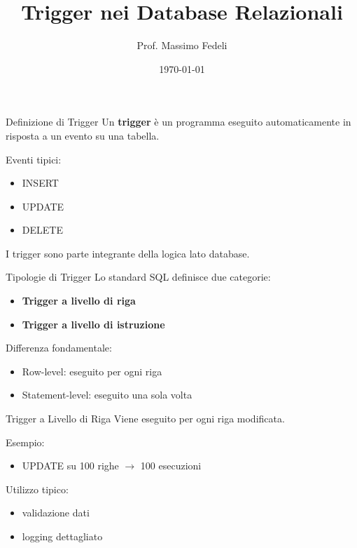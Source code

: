 \documentclass{beamer}
\title{Trigger nei Database Relazionali}
\author{Prof. Massimo Fedeli}
\date{\today}
\begin{document}
	
	\frame{\titlepage}
	
	\begin{frame}{Definizione di Trigger}
		Un \textbf{trigger} è un programma eseguito automaticamente in risposta a un evento su una tabella.
		
		\bigskip
		
		Eventi tipici:
		\begin{itemize}
			\item INSERT
			\item UPDATE
			\item DELETE
		\end{itemize}
		
		\bigskip
		
		I trigger sono parte integrante della logica lato database.
	\end{frame}
	
	\begin{frame}{Tipologie di Trigger}
		Lo standard SQL definisce due categorie:
		
		\begin{itemize}
			\item \textbf{Trigger a livello di riga}
			\item \textbf{Trigger a livello di istruzione}
		\end{itemize}
		
		\bigskip
		
		Differenza fondamentale:
		\begin{itemize}
			\item Row-level: eseguito per ogni riga
			\item Statement-level: eseguito una sola volta
		\end{itemize}
	\end{frame}
	
	\begin{frame}{Trigger a Livello di Riga}
		Viene eseguito per ogni riga modificata.
		
		\bigskip
		
		Esempio:
		\begin{itemize}
			\item UPDATE su 100 righe $\rightarrow$ 100 esecuzioni
		\end{itemize}
		
		\bigskip
		
		Utilizzo tipico:
		\begin{itemize}
			\item validazione dati
			\item logging dettagliato
		\end{itemize}
	\end{frame}
	
\end{document}
